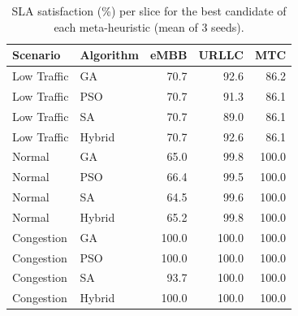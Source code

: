 \begin{table}[H]
\centering
\caption{SLA satisfaction (\%) per slice for the best candidate of each meta-heuristic (mean of 3 seeds).}
\label{tab:sla}
\begin{tabular}{llrrr}
\toprule
\textbf{Scenario} & \textbf{Algorithm} & \textbf{eMBB} & \textbf{URLLC} & \textbf{MTC} \\
\midrule
Low Traffic  & GA     & 70.7 & 92.6 & 86.2 \\
Low Traffic  & PSO    & 70.7 & 91.3 & 86.1 \\
Low Traffic  & SA     & 70.7 & 89.0 & 86.1 \\
Low Traffic  & Hybrid & 70.7 & 92.6 & 86.1 \\
\midrule
Normal       & GA     & 65.0 & 99.8 & 100.0 \\
Normal       & PSO    & 66.4 & 99.5 & 100.0 \\
Normal       & SA     & 64.5 & 99.6 & 100.0 \\
Normal       & Hybrid & 65.2 & 99.8 & 100.0 \\
\midrule
Congestion   & GA     & 100.0 & 100.0 & 100.0 \\
Congestion   & PSO    & 100.0 & 100.0 & 100.0 \\
Congestion   & SA     & 93.7  & 100.0 & 100.0 \\
Congestion   & Hybrid & 100.0 & 100.0 & 100.0 \\
\bottomrule
\end{tabular}
\end{table}


